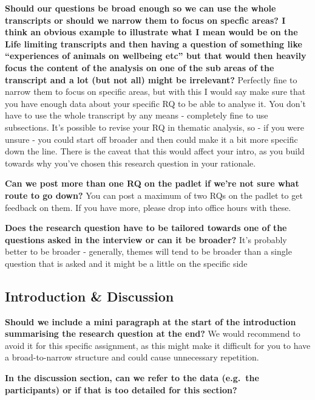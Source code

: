 \documentclass[
  english,
  letterpaper,
  DIV=11,
  numbers=noendperiod]{scrreprt}
\begin{document}
\textbf{Should our questions be broad enough so we can use the whole
transcripts or should we narrow them to focus on specfic areas? I think
an obvious example to illustrate what I mean would be on the Life
limiting transcripts and then having a question of something like
``experiences of animals on wellbeing etc'' but that would then heavily
focus the content of the analysis on one of the sub areas of the
transcript and a lot (but not all) might be irrelevant?} Perfectly fine
to narrow them to focus on specific areas, but with this I would say
make sure that you have enough data about your specific RQ to be able to
analyse it. You don't have to use the whole transcript by any means -
completely fine to use subsections. It's possible to revise your RQ in
thematic analysis, so - if you were unsure - you could start off broader
and then could make it a bit more specific down the line. There is the
caveat that this would affect your intro, as you build towards why
you've chosen this research question in your rationale.

\textbf{Can we post more than one RQ on the padlet if we're not sure
what route to go down?} You can post a maximum of two RQs on the padlet
to get feedback on them. If you have more, please drop into office hours
with these.

\textbf{Does the research question have to be tailored towards one of
the questions asked in the interview or can it be broader?} It's
probably better to be broader - generally, themes will tend to be
broader than a single question that is asked and it might be a little on
the specific side

\subsection{Introduction \& Discussion}\label{introduction-discussion}

\textbf{Should we include a mini paragraph at the start of the
introduction summarising the research question at the end?} We would
recommend to avoid it for this specific assignment, as this might make
it difficult for you to have a broad-to-narrow structure and could cause
unnecessary repetition.

\textbf{In the discussion section, can we refer to the data (e.g.~the
participants) or if that is too detailed for this section?}
\end{document}
